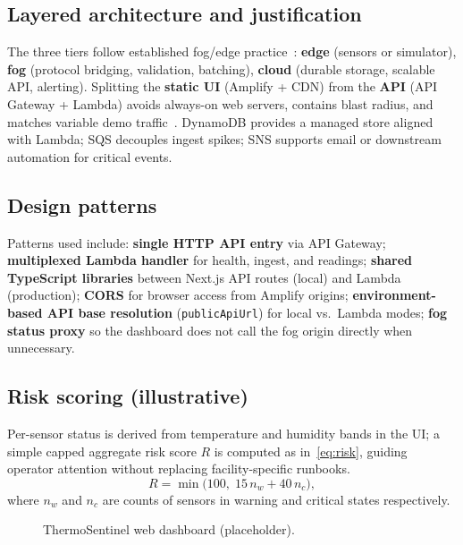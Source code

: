 \documentclass[conference]{IEEEtran}
\begin{document}
\subsection{Layered architecture and justification}
The three tiers follow established fog/edge practice~\cite{vaquero2014research,yi2015survey}: \textbf{edge} (sensors or simulator), \textbf{fog} (protocol bridging, validation, batching), \textbf{cloud} (durable storage, scalable API, alerting). Splitting the \textbf{static UI} (Amplify + CDN) from the \textbf{API} (API Gateway + Lambda) avoids always-on web servers, contains blast radius, and matches variable demo traffic~\cite{amazon2024apigw}. DynamoDB provides a managed store aligned with Lambda; SQS decouples ingest spikes; SNS supports email or downstream automation for critical events.

\subsection{Design patterns}
Patterns used include: \textbf{single HTTP API entry} via API Gateway; \textbf{multiplexed Lambda handler} for health, ingest, and readings; \textbf{shared TypeScript libraries} between Next.js API routes (local) and Lambda (production); \textbf{CORS} for browser access from Amplify origins; \textbf{environment-based API base resolution} (\texttt{publicApiUrl}) for local vs.\ Lambda modes; \textbf{fog status proxy} so the dashboard does not call the fog origin directly when unnecessary.

\subsection{Risk scoring (illustrative)}
Per-sensor status is derived from temperature and humidity bands in the UI; a simple capped aggregate risk score $R$ is computed as in~\eqref{eq:risk}, guiding operator attention without replacing facility-specific runbooks.
\begin{equation}
R = \min\bigl(100,\; 15\,n_w + 40\,n_c\bigr),
\label{eq:risk}
\end{equation}
where $n_w$ and $n_c$ are counts of sensors in warning and critical states respectively.

\begin{figure}[!t]
\centering
{}
\caption{ThermoSentinel web dashboard (placeholder).}
\label{fig:webapp}
\end{figure}
\end{document}
